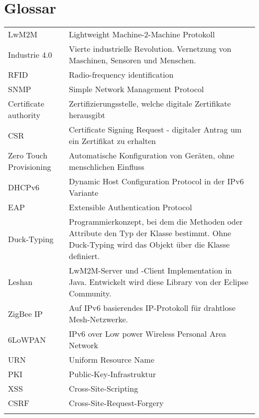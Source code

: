 \chapter{Glossar}
\begin{table}[H]
\centering
\begin{tabular}{@{} p{5cm} p{10cm}}    
LwM2M &   Lightweight Machine-2-Machine Protokoll \\ \addlinespace
Industrie 4.0 &  Vierte industrielle Revolution. Vernetzung von  Maschinen, Sensoren und Menschen.  \\ \addlinespace
RFID &  Radio-frequency identification\\ \addlinespace
SNMP &  Simple Network Management Protocol  \\ \addlinespace
Certificate authority & Zertifizierungsstelle, welche digitale Zertifikate herausgibt  \\ \addlinespace
CSR &   Certificate Signing Request - digitaler Antrag um ein Zertifikat zu erhalten\\ \addlinespace
Zero Touch Provisioning & Automatische Konfiguration von Geräten, ohne menschlichen Einfluss  \\ \addlinespace
DHCPv6 &    Dynamic Host Configuration Protocol in der IPv6 Variante\\ \addlinespace
EAP &  Extensible Authentication Protocol \\ \addlinespace
Duck-Typing &  Programmierkonzept, bei dem die Methoden oder Attribute den Typ der Klasse bestimmt. Ohne Duck-Typing wird das Objekt über die Klasse definiert. \\ \addlinespace
Leshan &  LwM2M-Server und -Client Implementation in Java. Entwickelt wird diese Library von der Eclipse Community. \\ \addlinespace
ZigBee IP &   Auf IPv6 basierendes IP-Protokoll für drahtlose Mesh-Netzwerke.
\\ \addlinespace
6LoWPAN &  IPv6 over Low power Wireless Personal Area Network \\ \addlinespace
URN &  Uniform Resource Name \\ \addlinespace
PKI &  Public-Key-Infrastruktur \\ \addlinespace
XSS &  Cross-Site-Scripting \\ \addlinespace
CSRF & Cross-Site-Request-Forgery  \\ \addlinespace
\end{tabular}
\end{table} 